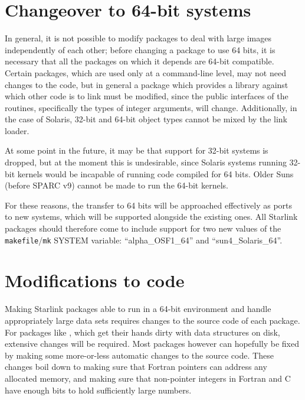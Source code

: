 \documentclass[twoside,11pt,nolof]{starlink}
\providecommand{\file}[1]{\texttt{#1}}
\begin{document}
\section{Changeover to 64-bit systems\label{sec:changeover}}

In general, it is not possible to modify packages to deal with large
images independently of each other;
before changing a package to use 64 bits, it is necessary
that all the packages on which it depends are 64-bit compatible.
Certain packages, which are used only at a command-line level,
may not need changes to the code, but in general
a package which provides a library
against which other code is to link must be modified,
since the public interfaces of the routines,
specifically the types of integer arguments, will change.
Additionally, in the case of Solaris,
32-bit and 64-bit object types cannot be mixed by the link loader.

At some point in the future, it may be that support for 32-bit systems
is dropped, but at the moment this is undesirable, since
Solaris systems running 32-bit kernels would be incapable of running
code compiled for 64 bits.
Older Suns (before SPARC v9) cannot be made to run the 64-bit kernels.

For these reasons, the transfer to 64 bits will be approached
effectively as ports to new systems, which will be supported
alongside the existing ones.  All Starlink packages should
therefore come to
include support for two new values of the \file{makefile}/\file{mk}
SYSTEM variable: ``alpha\_OSF1\_64'' and ``sun4\_Solaris\_64''.



\section{Modifications to code\label{sec:modificienda}}

Making Starlink packages able to run in a 64-bit environment and
handle appropriately large data sets requires changes to the source
code of each package.
For packages like ,
which get their hands dirty with data structures on disk,
extensive changes will be required.
Most packages however can hopefully be fixed by making some more-or-less
automatic changes to the source code.
These changes boil down to making sure that Fortran pointers
can address any allocated memory,
and making sure that non-pointer integers in Fortran and C
have enough bits to hold sufficiently large numbers.
\end{document}
